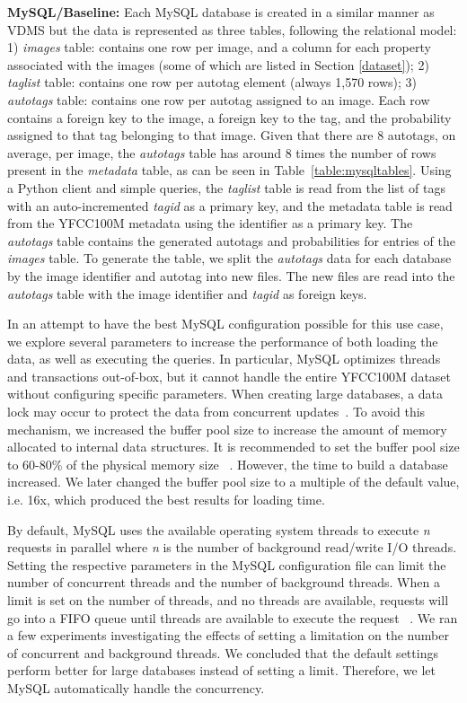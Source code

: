 \textbf{MySQL/Baseline:}
Each MySQL database is created in a similar manner as VDMS
but the data is represented as three tables, following the relational model:
1) \textit{images} table: contains one row per image,
and a column for each property
associated with the images (some of which are listed in Section \ref{dataset});
2) \textit{taglist} table: contains one row per autotag element
(always 1,570 rows);
3) \textit{autotags} table: contains one row per autotag
assigned to an image. Each row contains a foreign key to the
image, a foreign key to the tag, and
the probability assigned to that tag belonging to that image.
Given that there are 8 autotags, on average, per image, the \textit{autotags}
table has around 8 times the number of rows present in the
\textit{metadata} table, as can be seen in Table~\ref{table:mysqltables}.
Using a Python client and simple queries, the \textit{taglist}
table is read from the list of tags with an auto-incremented
\textit{tagid} as a primary key, and the metadata table
is read from the YFCC100M metadata using the identifier as a primary key.
The \textit{autotags} table contains the generated autotags and
probabilities for entries of the \textit{images} table.
To generate the table, we split the \textit{autotags} data for each database
by the image identifier and autotag into new files.
The new files are read into the \textit{autotags} table with the image
identifier and \textit{tagid} as foreign keys.

In an attempt to have the best MySQL configuration possible for this use case,
we explore several parameters to increase the performance
of both loading the data, as well as executing the queries.
In particular, MySQL optimizes threads and transactions out-of-box,
but it cannot handle the entire YFCC100M dataset without configuring
specific parameters.
When creating large databases, a data lock may occur to protect the
data from concurrent updates~\cite{mysql_blog}.
To avoid this mechanism, we increased the buffer pool size to
increase the amount of memory allocated to internal data structures.
It is recommended to set the buffer pool size to 60-80\% of the physical
memory size ~\cite{mysql,mysql_blog}.
However, the time to build a database increased.
We later changed  the buffer pool size to a multiple of the default value, i.e. 16x,
which produced the best results for loading time.

By default, MySQL uses the available operating system threads to
execute \textit{n} requests in parallel where \textit{n} is
the number of background read/write I/O threads.
Setting the respective parameters in the MySQL configuration file can limit the
number of concurrent threads and the number of background threads.
When a limit is set on the number of threads, and no threads are available,
requests will go into a FIFO queue until threads are available to execute
the request ~\cite{mysql,mysql_blog}.
We ran a few experiments investigating the effects of setting a limitation on the
number of concurrent and background threads.
We concluded that the default settings perform better for large databases instead of
setting a limit.
Therefore, we let MySQL automatically handle the concurrency.

